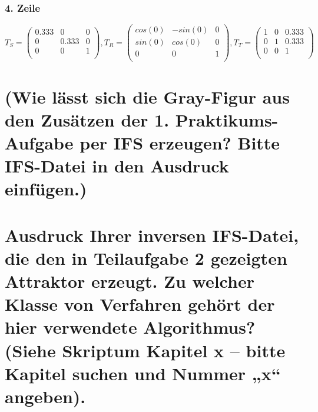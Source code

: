 \documentclass[]{article}
\begin{document}
\subsubsection*{4. Zeile}
\[
T_S = \begin{pmatrix}
0.333 & 0 & 0 \\
0 & 0.333 & 0 \\
0 & 0 & 1 \\
\end{pmatrix},
T_R = \begin{pmatrix}
cos(0) & -sin(0) & 0 \\
sin(0) & cos(0) & 0 \\
0 & 0 & 1 \\
\end{pmatrix},
T_T = \begin{pmatrix}
1 & 0 & 0.333 \\
0 & 1 & 0.333 \\
0 & 0 & 1 \\
\end{pmatrix}
\]

\section{(Wie lässt sich die Gray-Figur aus den Zusätzen der 1. Praktikums-Aufgabe per IFS erzeugen? Bitte IFS-Datei in den Ausdruck einfügen.)} 
\section{Ausdruck Ihrer inversen IFS-Datei, die den in Teilaufgabe 2 gezeigten Attraktor erzeugt. Zu welcher Klasse von Verfahren gehört der hier verwendete Algorithmus? (Siehe Skriptum Kapitel x – bitte Kapitel suchen und Nummer „x“ angeben).}
\end{document}
